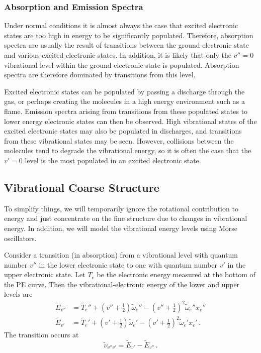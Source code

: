 \documentclass{article}
\theoremstyle{plain}\theoremheaderfont{\normalfont\itshape}\theorembodyfont{\rmfamily}\theoremseparator{.}\newtheorem*{rem}{Remark}\newtheorem*{ex}{Example}\newtheorem*{proof}{Proof}\newtheorem*{altp}{Alternative proof}
\theoremstyle{plain}\theoremheaderfont{\normalfont\bfseries}\theorembodyfont{\rmfamily}\theoremseparator{.}\newtheorem{thm}{Theorem}[section]\newtheorem{lem}[thm]{Lemma}\newtheorem{prop}[thm]{Proposition}\newtheorem*{cor}{Corollary}\newtheorem{defn}[thm]{Definition}\newtheorem{clm}[thm]{Claim}\newtheorem{clminproof}{Claim}\newtheorem{pos}{Postulate}[section]
\theoremstyle{break}\theoremheaderfont{\normalfont\itshape}\theorembodyfont{\rmfamily}\theoremseparator{.\medskip}\newtheorem*{proofskip}{Proof}\newtheorem*{exs}{Examples}\newtheorem*{rems}{Remarks}
\theoremstyle{break}\theoremheaderfont{\normalfont\bfseries}\theorembodyfont{\rmfamily}\theoremseparator{.\medskip}\newtheorem{lemskip}[thm]{Lemma}\newtheorem{defnskip}[thm]{Definition}\newtheorem{propskip}[thm]{Proposition}\newtheorem{thmskip}[thm]{Theorem}
\numberwithin{equation}{section}
\begin{document}
    \subsubsection{Absorption and Emission Spectra}
    Under normal conditions it is almost always the case that excited electronic states are too high in energy to be significantly populated. Therefore, absorption spectra are usually the result of transitions between the ground electronic state and various excited electronic states. In addition, it is likely that only the \(v''=0\) vibrational level within the ground electronic state is populated. Absorption spectra are therefore dominated by transitions from this level.

    Excited electronic states can be populated by passing a discharge through the gas, or perhaps creating the molecules in a high energy environment such as a flame. Emission spectra arising from transitions from these populated states to lower energy electronic states can then be observed. High vibrational states of the excited electronic states may also be populated in discharges, and transitions from these vibrational states may be seen. However, collisions between the molecules tend to degrade the vibrational energy, so it is often the case that the \(v'=0\) level is the most populated in an excited electronic state.

    \subsection{Vibrational Coarse Structure}
    To simplify things, we will temporarily ignore the rotational contribution to energy and just concentrate on the fine structure due to changes in vibrational energy. In addition, we will model the vibrational energy levels using Morse oscillators.

    Consider a transition (in absorption) from a vibrational level with quantum number \(v''\) in the lower electronic state to one with quantum number \(v'\) in the upper electronic state. Let \(T_e\) be the electronic energy measured at the bottom of the PE curve. Then the vibrational-electronic energy of the lower and upper levels are
    \begin{align}
        \tilde{E}_{v''}&=\tilde{T}_e''+\left(v''+\frac{1}{2}\right)\tilde{\omega}_e''-\left(v''+\frac{1}{2}\right)^2\tilde{\omega}_e''x_e''\\
        \tilde{E}_{v'}&=\tilde{T}_e'+\left(v'+\frac{1}{2}\right)\tilde{\omega}_e'-\left(v'+\frac{1}{2}\right)^2\tilde{\omega}_e'x_e'\,.
    \end{align}
    The transition occurs at
    \begin{equation}
        \tilde{\nu}_{v''v'}=\tilde{E}_{v'}-\tilde{E}_{v''}\,.
    \end{equation}
\end{document}
